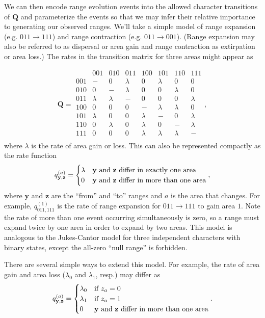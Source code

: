 \documentclass[11pt]{article}
\begin{document}
We can then encode range evolution events into the allowed character transitions of $\textbf{Q}$ and parameterize the events so that we may infer their relative importance to generating our observed ranges.
We'll take a simple model of range expansion (e.g. $011 \rightarrow 111$) and range contraction (e.g. $011 \rightarrow 001$).
(Range expansion may also be referred to as dispersal or area gain and range contraction as extirpation or area loss.)
The rates in the transition matrix for three areas might appear as

\[
\textbf{Q} = 
	\begin{array}{r|ccccccc}
		& 001 & 010 & 011 & 100 & 101 & 110 & 111 \\
		\hline
		001 & - & 0 & \lambda & 0 & \lambda & 0 & 0 \\
		010  & 0 & - & \lambda & 0 & 0 & \lambda & 0 \\
		011  & \lambda & \lambda & - & 0 & 0 & 0 & \lambda \\
		100  & 0 & 0 & 0 & - & \lambda & \lambda & 0 \\
		101  & \lambda & 0 & 0 & \lambda & - & 0 & \lambda \\
		110  & 0 & \lambda & 0 & \lambda & 0 & - & \lambda \\
		111  & 0 & 0 & 0 & \lambda & \lambda & \lambda & - \\								
	\end{array},
\]
where $\lambda$ is the rate of area gain or loss. This can also be represented compactly as the rate function
\[
q^{(a)}_{\textbf{y},\textbf{z}} =
\begin{cases}
\lambda & \text{\textbf{y} and \textbf{z} differ in exactly one area}  \\
0 & \text{\textbf{y} and \textbf{z} differ in more than one area}
\end{cases},
\]
where $\textbf{y}$ and $\textbf{z}$ are the ``from'' and ``to'' ranges and $a$ is the area that changes.
For example, $q^{(1)}_{011,111}$ is the rate of range expansion for $011 \rightarrow 111$ to gain area $1$.
Note the rate of more than one event occurring simultaneously is zero, so a range must expand twice by one area in order to expand by two areas.
This model is analogous to the Jukes-Cantor model for three independent characters with binary states, except the all-zero ``null range'' is forbidden.

There are several simple ways to extend this model. For example, the rate of area gain and area loss ($\lambda_0$ and $\lambda_1$, resp.) may differ as
\[
q^{(a)}_{\textbf{y},\textbf{z}} =
\begin{cases}
\lambda_0 & \text{if $z_a=0$}  \\
\lambda_1 & \text{if $z_a=1$} \\
0 & \text{\textbf{y} and \textbf{z} differ in more than one area}
\end{cases}.
\]
\end{document}
